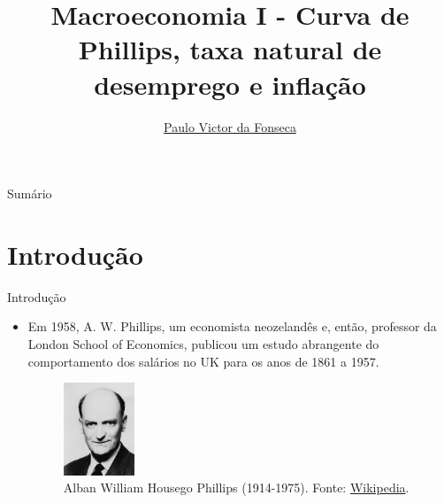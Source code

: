 \documentclass[10pt]{beamer}
\title[]{Macroeconomia I - Curva de Phillips, taxa natural de desemprego e inflação}
\author[]{\href{https://pvfonseca.github.io}{Paulo Victor da Fonseca}}
\date{}
\begin{document}
\begin{frame}[plain]
\end{frame}

\begin{frame}{Sumário}
    \tableofcontents
\end{frame}

\section{Introdução}
\begin{frame}{Introdução}
    \begin{itemize}
        \item Em 1958, A. W. Phillips, um economista neozelandês e, então, professor da London School of Economics, publicou um estudo abrangente do comportamento dos salários no UK para os anos de 1861 a 1957.
        \bigskip
        \begin{figure}
            \centering
            \includegraphics[width=0.2\textwidth]{./figures/aula13_fig1.jpg}
            \caption{Alban William Housego Phillips (1914-1975). Fonte: \href{https://en.wikipedia.org/wiki/William_Phillips_(economist)}{Wikipedia}.}
            \label{fig1}
        \end{figure}
    \end{itemize}
\end{frame}
\end{document}
